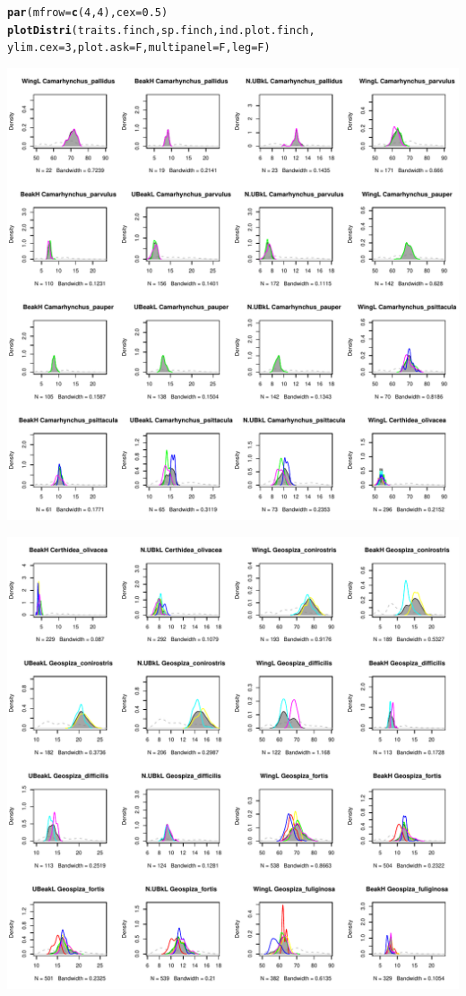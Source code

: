 \documentclass[12pt]{article}\usepackage[]{graphicx}\usepackage[]{color}
\makeatletter
\def\maxwidth{ %
  \ifdim\Gin@nat@width>\linewidth
    \linewidth
  \else
    \Gin@nat@width
  \fi
}
\newcommand{\hlnum}[1]{\textcolor[rgb]{0.686,0.059,0.569}{#1}}%
\newcommand{\hlstd}[1]{\textcolor[rgb]{0.345,0.345,0.345}{#1}}%
\newcommand{\hlkwc}[1]{\textcolor[rgb]{0.333,0.667,0.333}{#1}}%
\newcommand{\hlkwd}[1]{\textcolor[rgb]{0.737,0.353,0.396}{\textbf{#1}}}%
\newenvironment{kframe}{%
 \def\at@end@of@kframe{}%
 \ifinner\ifhmode%
  \def\at@end@of@kframe{\end{minipage}}%
  \begin{minipage}{\columnwidth}%
 \fi\fi%
 \def\FrameCommand##1{\hskip\@totalleftmargin \hskip-\fboxsep
 \colorbox{shadecolor}{##1}\hskip-\fboxsep
     \hskip-\linewidth \hskip-\@totalleftmargin \hskip\columnwidth}%
 \MakeFramed {\advance\hsize-\width
   \@totalleftmargin\z@ \linewidth\hsize
   \@setminipage}}%
 {\par\unskip\endMakeFramed%
 \at@end@of@kframe}
\newenvironment{knitrout}{}{} %
\makeatother
\begin{document}
\begin{knitrout}
\color{fgcolor}\begin{kframe}
\begin{alltt}
\hlkwd{par}\hlstd{(}\hlkwc{mfrow}\hlstd{=}\hlkwd{c}\hlstd{(}\hlnum{4}\hlstd{,}\hlnum{4}\hlstd{),} \hlkwc{cex}\hlstd{=}\hlnum{0.5}\hlstd{)}
\hlkwd{plotDistri}\hlstd{(traits.finch, sp.finch, ind.plot.finch,}
          \hlkwc{ylim.cex}\hlstd{=}\hlnum{3}\hlstd{,} \hlkwc{plot.ask}\hlstd{=F,} \hlkwc{multipanel}\hlstd{=F,} \hlkwc{leg}\hlstd{=F)}
\end{alltt}
\end{kframe}
\includegraphics[width=\maxwidth]{figure/unnamed-chunk-101} 

\includegraphics[width=\maxwidth]{figure/unnamed-chunk-102} 


\end{knitrout}
\end{document}

